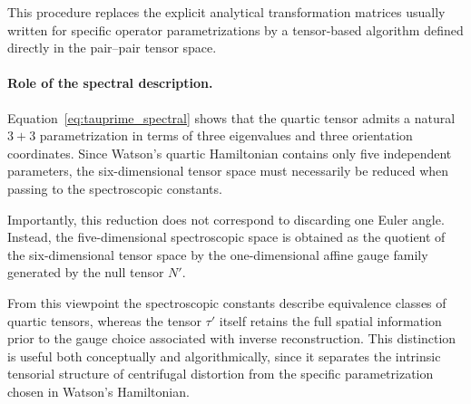 This procedure replaces the explicit analytical transformation matrices
usually written for specific operator parametrizations by a tensor-based
algorithm defined directly in the pair--pair tensor space.

\paragraph{Role of the spectral description.}

Equation~\eqref{eq:tauprime_spectral} shows that the quartic tensor
admits a natural $3+3$ parametrization in terms of three eigenvalues and
three orientation coordinates. Since Watson's quartic Hamiltonian
contains only five independent parameters, the six-dimensional tensor
space must necessarily be reduced when passing to the spectroscopic
constants.

Importantly, this reduction does not correspond to discarding one Euler
angle. Instead, the five-dimensional spectroscopic space is obtained as
the quotient of the six-dimensional tensor space by the
one-dimensional affine gauge family generated by the null tensor $N'$.

From this viewpoint the spectroscopic constants describe equivalence
classes of quartic tensors, whereas the tensor $\tau'$ itself retains
the full spatial information prior to the gauge choice associated with
inverse reconstruction. This distinction is useful both conceptually
and algorithmically, since it separates the intrinsic tensorial
structure of centrifugal distortion from the specific parametrization
chosen in Watson's Hamiltonian.
